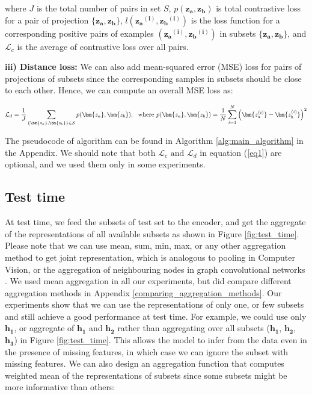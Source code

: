  
where $J$ is the total number of pairs in set $S$, $p(\bm{z_a},\bm{z_b})$ is total contrastive loss for a pair of projection $\{\bm{z_a}, \bm{z_b}\}$, $l(\bm{{z_a}^{(i)}}, \bm{{z_b}^{(i)}})$ is the loss function for a corresponding positive pairs of examples $(\bm{{z_a}^{(i)}}, \bm{{z_b}^{(i)}})$ in subsets $\{\bm{z_a}, \bm{z_b}\}$, and $\mathcal{L}_c$ is the average of contrastive loss over all pairs. 

\textbf{iii) Distance loss:} We can also add mean-squared error (MSE) loss for pairs of projections of subsets since the corresponding samples in subsets should be close to each other. Hence, we can compute an overall MSE loss as:

\begin{equation}\label{eq5}
\mathcal{L}_d = \frac{1}{J}\sum_{\{\bm{z_a},\bm{z_b}\}\in S} p(\bm{z_a},\bm{z_b})\mbox{, \, where } p(\bm{z_a},\bm{z_b}) = \frac{1}{N}\sum_{i=1}^{N} \left( \bm{z_a^{(i)}}-\bm{z_b^{(i)}}\right)^2
\end{equation}

The pseudocode of algorithm can be found in Algorithm \ref{alg:main_algorithm} in the Appendix. We should note that both $\mathcal{L}_c \mbox{ and }\mathcal{L}_d$ in equation (\ref{eq1}) are optional, and we used them only in some experiments.

\subsection{Test time} At test time, we feed the subsets of test set to the encoder, and get the aggregate of the representations of all available subsets as shown in Figure \ref{fig:test_time}. Please note that we can use mean, sum, min, max, or any other aggregation method to get joint representation, which is analogous to pooling in Computer Vision, or the aggregation of neighbouring nodes in graph convolutional networks \citep{kipf2016semi}. We used mean aggregation in all our experiments, but did compare different aggregation methods in Appendix \ref{comparing_aggregation_methods}. Our experiments show that we can use the representations of only one, or few subsets and still achieve a good performance at test time. For example, we could use only $\bm{h_1}$, or aggregate of $\bm{h_1}$ and $\bm{h_2}$ rather than aggregating over all subsets ($\bm{h_1}$, $\bm{h_2}$, $\bm{h_3}$) in Figure \ref{fig:test_time}. This allows the model to infer from the data even in the presence of missing features, in which case we can ignore the subset with missing features. We can also design an aggregation function that computes weighted mean of the representations of subsets since some subsets might be more informative than others:


